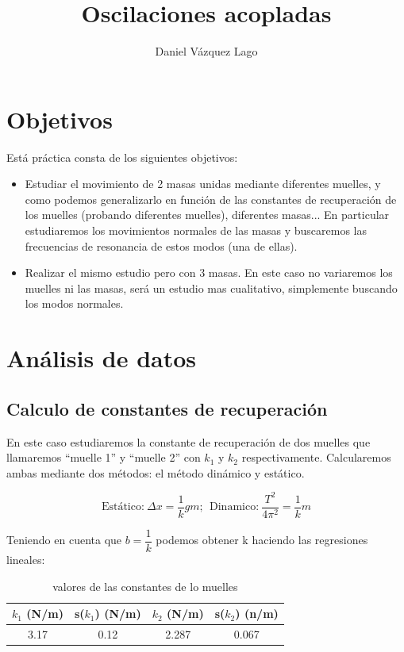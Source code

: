 \documentclass[12pt,a4paper]{article}
\author{Daniel Vázquez Lago}
\title{Oscilaciones acopladas}
\begin{document}
\maketitle

\newpage

\tableofcontents

\newpage

\section{Objetivos}

Está práctica consta de los siguientes objetivos:

\begin{itemize}
\item Estudiar el movimiento de 2 masas unidas mediante diferentes muelles, y como podemos generalizarlo en función de las constantes de recuperación de los muelles (probando diferentes muelles), diferentes masas... En particular estudiaremos los movimientos normales de las masas y buscaremos las frecuencias de resonancia de estos modos (una de ellas).

\item Realizar el mismo estudio pero con 3 masas. En este caso no variaremos los muelles ni las masas, será un estudio mas cualitativo, simplemente buscando los modos normales.
\end{itemize}

\section{Análisis de datos}
\subsection{Calculo de constantes de recuperación}
En este caso estudiaremos la constante de recuperación de dos muelles que llamaremos ``muelle 1'' y ``muelle 2'' con $k_1$ y $k_2$  respectivamente. Calcularemos ambas mediante dos métodos: el método dinámico y estático. 

\begin{equation}
\text{Estático:} \ \Delta x = \dfrac{1}{k} g m ;  \ \ \text{Dinamico:} \ \dfrac{T^2}{4 \pi^2} = \dfrac{1}{k} m 
\end{equation} 

Teniendo en cuenta que $b=\dfrac{1}{k}$ podemos obtener k haciendo las regresiones lineales:


\begin{table}[h!] \centering 
\begin{tabular}{|c|c|c|c|}  
\hline 
$k_1$ (N/m) 	 & s($k_1$) (N/m) 	 & $k_2$ (N/m) 	 & s($k_2$) (n/m) \\ \hline  
3.17 	 & 0.12  	 & 2.287   	 & 0.067 \\ \hline 
\end{tabular} 
\caption{valores de las constantes de lo muelles} 
\label{tab:constantes-muelles} 
\end{table}
\end{document}
